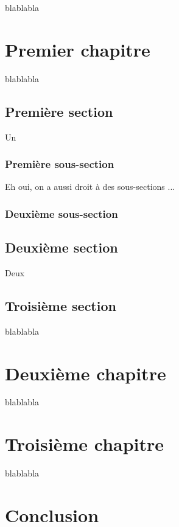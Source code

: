 \documentclass[a4paper,11pt,notitlepage]{report}
\theoremstyle{definition}
\begin{document}
blablabla



\chapter{Premier chapitre} \label{ch_prem}

blablabla


\section{Première section} \label{sec_un}

Un

\subsection{Première sous-section} \label{sec_sous_un}

Eh oui, on a aussi droit à des sous-sections ... 

\subsection{Deuxième sous-section} \label{sec_sous_deux}


\section{Deuxième section} \label{sec_deux}

Deux

\section{Troisième section} \label{sec_trois}

blablabla

\chapter{Deuxième chapitre} \label{ch_deux}

blablabla

\chapter{Troisième chapitre} \label{ch_fin}

blablabla

\chapter{Conclusion} \label{ch_ccls}
\end{document}
